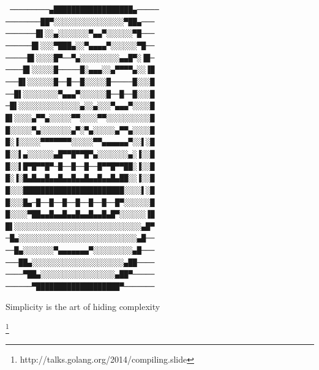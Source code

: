 \documentclass[xelatex,aspectratio=169]{beamer}
\newcommand\blfootnote[1]{%
	\begingroup
	\renewcommand\thefootnote{}\footnote{#1}%
	\endgroup
}
\begin{document}
\begin{frame}
\begin{centering}
\texttt{\tiny
─────────▄██████████████████▄─────\\
────────██▀░░░░░░░░░░░░░░░░▀██▄───\\
───────█▌░░▄░░░░░░░▀▄▄▀░░░░░░▀█───\\
──────█▌░░░▀███▄░░▀▄▄▄▄▀░░░░░░▀█──\\
─────█▌░░░░█▀──▀▄░░░░░░░░░▄▄█▀░▐█─\\
────█▌░░░░░█─────█░▄▄▄░░▄▀▀▀▀▄░░▐█\\
───█▌░░░░░░█──█──█░░░░░█─────█░░░█\\
──█▌░░░░░░░░▀▄▄▄▀░░░░░░█──█──█░░░█\\
─█▌░░░░░░░░░░░░░░▄░░▄░░░▀▄▄▄▀░░░░█\\
█▌░░░░▄▀▀▄░░░░░▀▀░░░░▀▀░░░░░░░░░░█\\
█░░░░░▀▄░░░░░░░▄▀░▀▄░░░░░▄▀▀▄░░░░█\\
█░▐░░░░░▀▀▀▀▀▀▀░░░░░▀▀▄▄▄▄▄▄▀░░▌░█\\
█░░▌▄░░░░░░▄█▀▀█▀▀█▀▄░░░░░░░▄░▐░░█\\
█░░▌█▀█▀▀█▀─█──█──█──█▀▀█▀▀██░▐░░█\\
█░▐░█▄█▄▄█▄▄█▄▄█▄▄█▄▄█▄▄█▄██░░▐░░█\\
█░░░███████████████████████░░░░▌░█\\
█░░░█▄─█──█──█──█──█──█──█▀░░░░░░█\\
█░░░░▀██▄▄█▄▄█▄▄█▄▄█▄▄█▄█▀░░░░░░▐█\\
█▌░░░░░░░░░░░░░░░░░░░░░░░░░░░░░▄█▀\\
─█▄░░░░░░░░░░░░░░░░░░░░░░░░░░░▄█──\\
──█▄░░░░░░░▀▄▄▄▄▄▄▄▀░░░░░░░░░▄█───\\
───██▄░░░░░░░░░░░░░░░░░░░░░▄██────\\
────▀██▄░░░░░░░░░░░░░░░░░▄██▀─────\\
──────▀███████████████████▀───────\\
}
\end{centering}
\end{frame}

\begin{frame}
	\begin{fancyquote}
		Simplicity is the art of hiding complexity
	\end{fancyquote}
\end{frame}

\begin{frame}
	\begin{fancyquote}
	\end{fancyquote}
	\blfootnote{http://talks.golang.org/2014/compiling.slide}
\end{frame}
\end{document}
